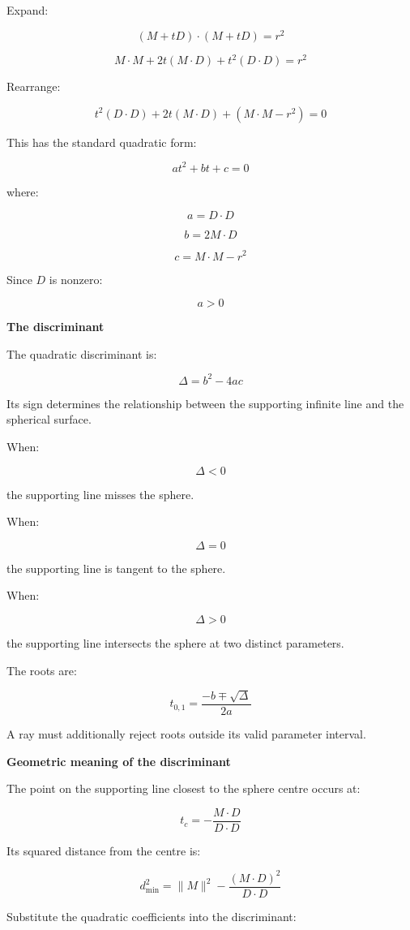 Expand:

\[
(M+tD)\cdot(M+tD)=r^2
\]

\[
M\cdot M+2t(M\cdot D)+t^2(D\cdot D)=r^2
\]

Rearrange:

\[
t^2(D\cdot D)+2t(M\cdot D)+(M\cdot M-r^2)=0
\]

This has the standard quadratic form:

\[
\boxed{at^2+bt+c=0}
\]

where:

\[
\boxed{ a=D\cdot D }
\]

\[
\boxed{ b=2M\cdot D }
\]

\[
\boxed{ c=M\cdot M-r^2 }
\]

Since \(D\) is nonzero:

\[
a>0
\]

\textbf{The discriminant}

The quadratic discriminant is:

\[
\boxed{ \Delta=b^2-4ac }
\]

Its sign determines the relationship between the supporting infinite line and the spherical surface.

When:

\[
\Delta<0
\]

the supporting line misses the sphere.

When:

\[
\Delta=0
\]

the supporting line is tangent to the sphere.

When:

\[
\Delta>0
\]

the supporting line intersects the sphere at two distinct parameters.

The roots are:

\[
\boxed{ t_{0,1}= \frac{-b\mp\sqrt{\Delta}}{2a} }
\]

A ray must additionally reject roots outside its valid parameter interval.

\textbf{Geometric meaning of the discriminant}

The point on the supporting line closest to the sphere centre occurs at:

\[
t_c=-\frac{M\cdot D}{D\cdot D}
\]

Its squared distance from the centre is:

\[
d_{\min}^2= \|M\|^2- \frac{(M\cdot D)^2}{D\cdot D}
\]

Substitute the quadratic coefficients into the discriminant:

